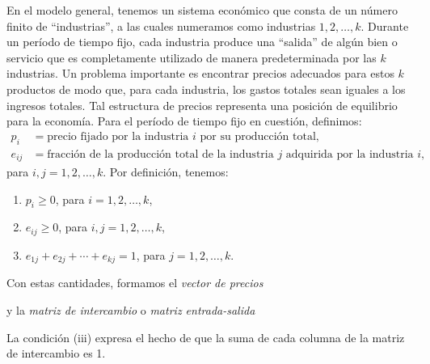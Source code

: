 En el modelo general, tenemos un sistema económico que consta de un número finito de “industrias”, a las cuales numeramos como industrias $1, 2, \dots, k$. Durante un período de tiempo fijo, cada industria produce una “salida” de algún bien o servicio que es completamente utilizado de manera predeterminada por las $k$ industrias. Un problema importante es encontrar precios adecuados para estos $k$ productos de modo que, para cada industria, los gastos totales sean iguales a los ingresos totales. Tal estructura de precios representa una posición de equilibrio para la economía. Para el período de tiempo fijo en cuestión, definimos:
\begin{align*}
    p_i & = \text{precio fijado por la industria $i$ por su producción total}, \\
    e_{ij} & = \text{fracción de la producción total de la industria $j$ adquirida por la industria $i$},
\end{align*}
para $i, j = 1, 2, \dots, k$. Por definición, tenemos:
\begin{enumerate}[label=\roman*)]
    \item $p_i \geq 0$, para $i = 1, 2, \dots, k$,
    \item $e_{ij} \geq 0$, para $i, j = 1, 2, \dots, k$,
    \item $e_{1j} + e_{2j} + \cdots + e_{kj} = 1$, para $j = 1, 2, \dots, k$.
\end{enumerate}
Con estas cantidades, formamos el \emph{vector de precios}
\begin{matrizn}
\end{matrizn}
y la \emph{matriz de intercambio} o \emph{matriz entrada-salida}
\begin{matrizn}
\end{matrizn}
La condición (iii) expresa el hecho de que la suma de cada columna de la matriz de intercambio es 1.

